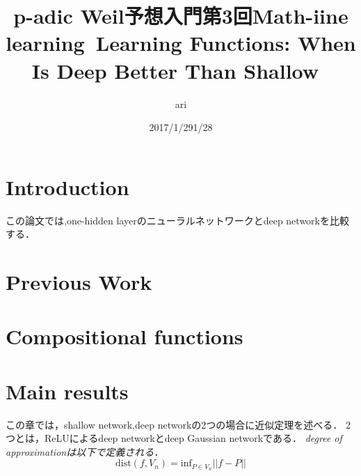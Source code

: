 \documentclass{ujarticle}
\author{ari}
\title{p-adic Weil予想入門}
\date{2017/1/29}
\title{第3回Math-iine learning~Learning Functions: When Is Deep Better Than Shallow~}
\author{}
\date{1/28}
\begin{document}
\maketitle
\tableofcontents

\section{Introduction}
\label{sec:Introduction}
この論文では,one-hidden layerのニューラルネットワークとdeep networkを比較する．

\section{Previous Work}
\label{sec:Previous Work}

\section{Compositional functions}
\label{sec:Compositional functions}

\section{Main results}
\label{sec:Main results}
この章では，shallow network,deep networkの2つの場合に近似定理を述べる．
2つとは，ReLUによるdeep networkとdeep Gaussian networkである．
\it{degree of approximation}は以下で定義される．
\begin{equation}
　\mathrm{dist}(f,V_n)= \mathrm{inf}_{P \in V_n}||f - P||
\end{equation}
\end{document}
